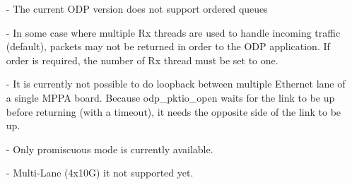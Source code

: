 \documentclass{trkalray}
\begin{document}
\begin{itemize}
\item[-]{The current ODP version does not support ordered queues}
\item[-]{In some case where multiple Rx threads are used to handle incoming traffic
  (default), packets may not be returned in order to the ODP
  application. If order is required, the number of Rx thread must be
  set to one.}
\item[-]{It is currently not possible to do loopback between multiple
  Ethernet lane of a single MPPA board. Because odp\_pktio\_open waits
  for the link to be up before returning (with a timeout), it needs
  the opposite side of the link to be up.}
\item[-]{Only promiscuous mode is currently available.}
\item[-]{Multi-Lane (4x10G) it not supported yet.}
\end{itemize}
\end{document}
